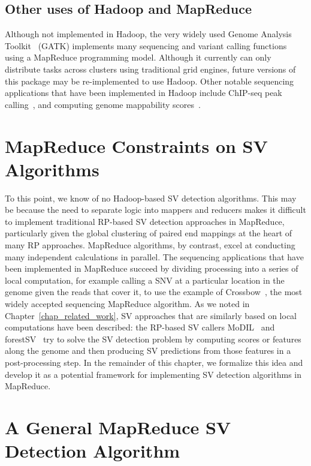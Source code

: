 \subsection{Other uses of Hadoop and MapReduce}

Although not implemented in Hadoop, the very widely used Genome Analysis Toolkit~\cite{McKenna:2010p1051} (GATK) implements many sequencing and variant calling functions using a MapReduce programming model. Although it currently can only distribute tasks across clusters using traditional grid engines, future versions of this package may be re-implemented to use Hadoop. Other notable sequencing applications that have been implemented in Hadoop include ChIP-seq peak calling~\cite{Feng:2011p1228}, and computing genome mappability scores~\cite{Lee:2012bk}. 

\section{MapReduce Constraints on SV Algorithms}

To this point, we know of no Hadoop-based SV detection algorithms. This may be because the need to separate logic into mappers and reducers makes it difficult to implement traditional RP-based SV detection approaches in MapReduce, particularly given the global clustering of paired end mappings at the heart of many RP approaches. MapReduce algorithms, by contrast, excel at conducting many independent calculations in parallel. The sequencing applications that have been implemented in MapReduce succeed by dividing processing into a series of local computation, for example calling a SNV at a particular location in the genome given the reads that cover it, to use the example of Crossbow~\cite{Langmead:2009p1225}, the most widely accepted sequencing MapReduce algorithm. As we noted in Chapter~\ref{chap_related_work}, SV approaches that are similarly based on local computations have been described: the RP-based SV callers MoDIL~\cite{Lee:2009da} and forestSV~\cite{Michaelson:2012fj} try to solve the SV detection problem by computing scores or features along the genome and then producing SV predictions from those features in a post-processing step. In the remainder of this chapter, we formalize this idea and develop it as a potential framework for implementing SV detection algorithms in MapReduce.

\section{A General MapReduce SV Detection Algorithm}\label{section_general_algo}

